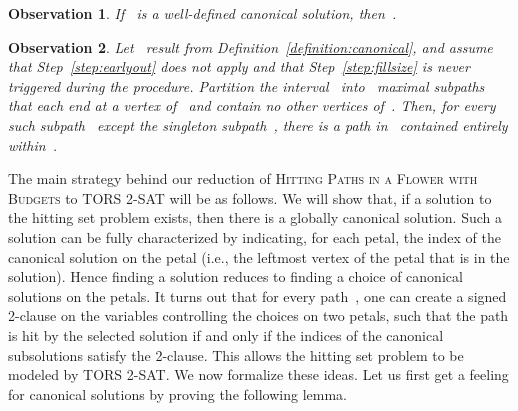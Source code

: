 \let\accentvec\vec  \documentclass{llncs}
\newtheorem{observation}{Observation}
\newcommand{\HitPathsInFlower}{\textsc{Hitting Paths in a Flower with Budgets}\xspace}
\newcommand{\TORSTwoSat}{\textsc{TORS 2-SAT}\xspace}
\begin{document}
\begin{observation} \label{observation:leftmost}
If~ is a well-defined canonical solution, then~.
\end{observation}

\begin{observation} \label{observation:partition}
Let~ result from Definition~\ref{definition:canonical}, and assume that Step~\ref{step:earlyout} does not apply and that Step~\ref{step:fillsize} is never triggered during the procedure. Partition the interval~ into~ maximal subpaths that each end at a vertex of~ and contain no other vertices of~. Then, for every such subpath~ except the singleton subpath~, there is a path in~ contained entirely within~.
\end{observation}

The main strategy behind our reduction of \HitPathsInFlower to \TORSTwoSat will be as follows. We will show that, if a solution to the hitting set problem exists, then there is a globally canonical solution. Such a solution can be fully characterized by indicating, for each petal, the index of the canonical solution on the petal (i.e., the leftmost vertex of the petal that is in the solution). Hence finding a solution reduces to finding a choice of canonical solutions on the petals. It turns out that for every path~, one can create a signed 2-clause on the variables controlling the choices on two petals, such that the path is hit by the selected solution if and only if the indices of the canonical subsolutions satisfy the 2-clause. This allows the hitting set problem to be modeled by \TORSTwoSat. We now formalize these ideas. Let us first get a feeling for canonical solutions by proving the following lemma.
\end{document}
